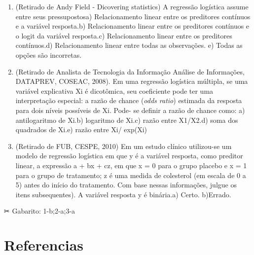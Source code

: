 \documentclass[
]{book}
\begin{document}
\begin{question}

\begin{enumerate}
\def\labelenumi{\arabic{enumi}.}
\item
  (Retirado de Andy Field - Dicovering statistics) A regressão logística assume entre seus pressupostosa) Relacionamento linear entre os preditores contínuos e a variável resposta.b) Relacionamento linear entre os preditores contínuos e o logit da variável resposta.c) Relacionamento linear entre os preditores contínuos.d) Relacionamento linear entre todas as observações. e) Todas as opções são incorretas.
\item
  (Retirado de Analista de Tecnologia da Informação Análise de Informações, DATAPREV, COSEAC, 2008). Em uma regressão logística múltipla, se uma variável explicativa Xi é dicotômica, seu coeficiente pode ter uma interpretação especial: a razão de chance (\emph{odds ratio}) estimada da resposta para dois níveis possíveis de Xi. Pode- se definir a razão de chance como: a) antilogaritmo de Xi.b) logaritmo de Xi.c) razão entre X1/X2.d) soma dos quadrados de Xi.e) razão entre Xi/ exp(Xi)
\item
  (Retirado de FUB, CESPE, 2010) Em um estudo clínico utilizou-se um modelo de regressão logística em que y é a variável resposta, como preditor linear, a expressão a + bx + cz, em que x = 0 para o grupo placebo e x = 1 para o grupo de tratamento; z é uma medida de colesterol (em escala de 0 a 5) antes do início do tratamento. Com base nessas informações, julgue os itens subsequentes). A variável resposta y é binária.a) Certo.
  b)Errado.
\end{enumerate}

\end{question}

\begin{mirror}

✂ Gabarito: 1-b;2-a;3-a

\end{mirror}

\hypertarget{referencias}{%
\chapter{Referencias}\label{referencias}}

  
\end{document}
